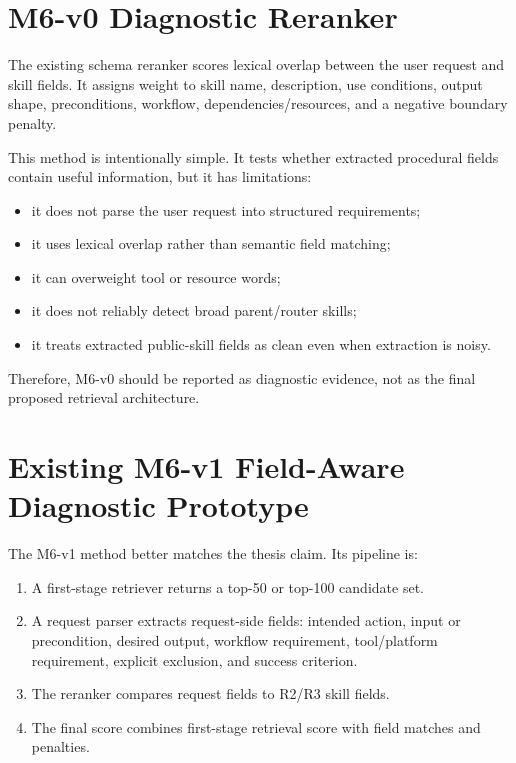 \section{M6-v0 Diagnostic Reranker}

The existing schema reranker scores lexical overlap between the user request and skill fields. It assigns weight to skill name, description, use conditions, output shape, preconditions, workflow, dependencies/resources, and a negative boundary penalty.

This method is intentionally simple. It tests whether extracted procedural fields contain useful information, but it has limitations:

\begin{itemize}
  \item it does not parse the user request into structured requirements;
  \item it uses lexical overlap rather than semantic field matching;
  \item it can overweight tool or resource words;
  \item it does not reliably detect broad parent/router skills;
  \item it treats extracted public-skill fields as clean even when extraction is noisy.
\end{itemize}

Therefore, M6-v0 should be reported as diagnostic evidence, not as the final proposed retrieval architecture.

\section{Existing M6-v1 Field-Aware Diagnostic Prototype}

The M6-v1 method better matches the thesis claim. Its pipeline is:

\begin{enumerate}
  \item A first-stage retriever returns a top-50 or top-100 candidate set.
  \item A request parser extracts request-side fields: intended action, input or precondition, desired output, workflow requirement, tool/platform requirement, explicit exclusion, and success criterion.
  \item The reranker compares request fields to R2/R3 skill fields.
  \item The final score combines first-stage retrieval score with field matches and penalties.
\end{enumerate}

